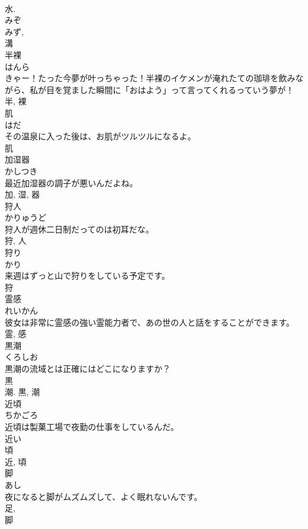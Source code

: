 \documentclass[8pt]{extreport}
\begin{document}
\begin{CJK}{UTF8}{min}
\\	水. 
\\	みぞ 
\\	みず, 
\\	溝	
\\	半裸	
\\	はんら	
\\	きゃー！たった今夢が叶っちゃった！半裸のイケメンが淹れたての珈琲を飲みながら、私が目を覚ました瞬間に「おはよう」って言ってくれるっていう夢が！	
\\	半, 裸	
\\	肌	
\\	はだ	
\\	その温泉に入った後は、お肌がツルツルになるよ。	
\\	肌	
\\	加湿器	
\\	かしつき	
\\	最近加湿器の調子が悪いんだよね。	
\\	加, 湿, 器	
\\	狩人	
\\	かりゅうど	
\\	狩人が週休二日制だってのは初耳だな。	
\\	狩, 人	
\\	狩り	
\\	かり	
\\	来週はずっと山で狩りをしている予定です。	
\\	狩	
\\	霊感	
\\	れいかん	
\\	彼女は非常に霊感の強い霊能力者で、あの世の人と話をすることができます。	
\\	霊, 感	
\\	黒潮	
\\	くろしお	
\\	黒潮の流域とは正確にはどこになりますか？	
\\	黒 
\\	潮.	黒, 潮	
\\	近頃	
\\	ちかごろ	
\\	近頃は製菓工場で夜勤の仕事をしているんだ。	
\\	近い 
\\	頃 
\\	近, 頃	
\\	脚	
\\	あし	
\\	夜になると脚がムズムズして、よく眠れないんです。	
\\	足, 
\\	脚	

\end{CJK}
\end{document}
